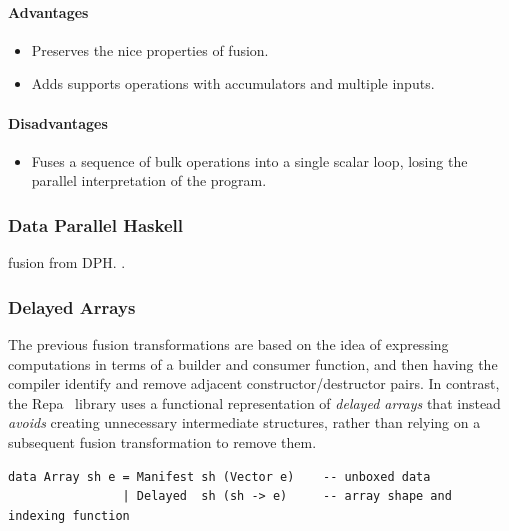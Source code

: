 \paragraph{Advantages}
\begin{itemize}
    \item Preserves the nice properties of
         fusion.
    \item Adds supports operations with accumulators and multiple inputs.
\end{itemize}

\paragraph{Disadvantages}
\begin{itemize}
    \item Fuses a sequence of bulk operations into a single scalar loop, losing
        the parallel interpretation of the program.
\end{itemize}



\subsubsection{Data Parallel Haskell}
 fusion from
DPH.
\citet{Chakravarty:2007tc,Jones:2008uu}.


\subsubsection{Delayed Arrays}

The previous fusion transformations are based on the idea of expressing
computations in terms of a builder and consumer function, and then having the
compiler identify and remove adjacent constructor/destructor pairs. In contrast,
the Repa~\cite{Keller:2010er} library uses a functional representation of
\emph{delayed arrays} that instead \emph{avoids}
creating unnecessary intermediate structures, rather than relying on a
subsequent fusion transformation to remove them.

\begin{lstlisting}[style=Haskell,numbers=none,caption={Repa-1 style array definition},label={lst:repa_arrays}]
data Array sh e = Manifest sh (Vector e)    -- unboxed data
                | Delayed  sh (sh -> e)     -- array shape and indexing function
\end{lstlisting}

